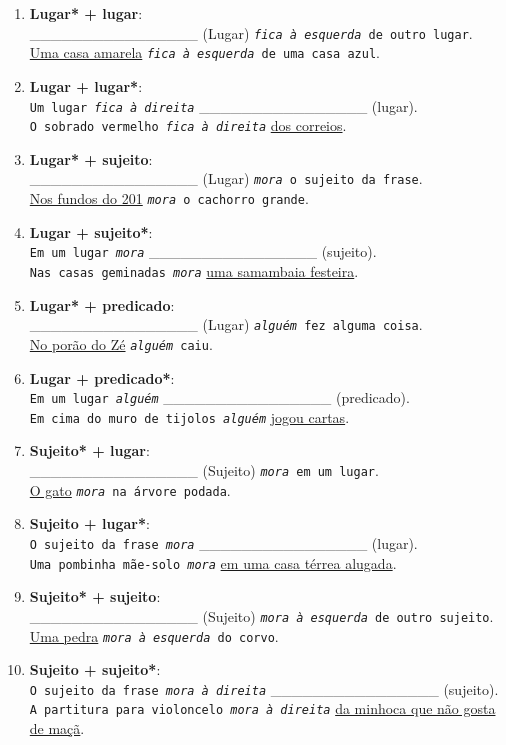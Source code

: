 \documentclass[12pt]{article}
\newcommand{\linha}{ \_\_\_\_\_\_\_\_\_\_\_\_\_\_\_\_ }
\newcommand{\tipo}[2]{\bigskip \item\textbf{#1 + #2}: \\}
\begin{document}
\begin{enumerate}
	\tipo{Lugar*}{lugar} 
		\linha (Lugar) \texttt{\textit{fica à esquerda} de outro lugar}.
		\\ \underline{Uma casa amarela} \texttt{\textit{fica à esquerda} de uma casa azul}.
		  
	\tipo{Lugar}{lugar*} 
		\texttt{Um lugar \textit{fica à direita}} \linha (lugar).	
		\\ \texttt{O sobrado vermelho \textit{fica à direita}} \underline{dos correios}.
		
	\tipo{Lugar*}{sujeito} 
		\linha (Lugar) \texttt{\textit{mora} o sujeito da frase}.
		\\ \underline{Nos fundos do 201} \texttt{\textit{mora} o cachorro grande}.
	
	\tipo{Lugar}{sujeito*} 
		\texttt{Em um lugar \textit{mora}} \linha (sujeito).
		\\ \texttt{Nas casas geminadas \textit{mora}} \underline{uma samambaia festeira}.
				
	\tipo{Lugar*}{predicado} 
		\linha (Lugar) \texttt{\textit{alguém} fez alguma coisa}.	
		\\ \underline{No porão do Zé} \texttt{\textit{alguém} caiu}.
		
	\tipo{Lugar}{predicado*} 
		\texttt{Em um lugar \textit{alguém}} \linha (predicado).	
		\\ \texttt{Em cima do muro de tijolos \textit{alguém}} \underline{jogou cartas}.
	
	\newpage
		
	\tipo{Sujeito*}{lugar} 
		\linha (Sujeito) \texttt{\textit{mora} em um lugar}.
		\\ \underline{O gato} \texttt{\textit{mora} na árvore podada}.
	
	\tipo{Sujeito}{lugar*} 
		\texttt{O sujeito da frase \textit{mora}} \linha (lugar).	
		\\ \texttt{Uma pombinha mãe-solo \textit{mora}} \underline{em uma casa térrea alugada}.
		
	\tipo{Sujeito*}{sujeito} 
		\linha (Sujeito) \texttt{\textit{mora à esquerda} de outro sujeito}.
		\\ \underline{Uma pedra} \texttt{\textit{mora à esquerda} do corvo}.
	
	\tipo{Sujeito}{sujeito*} 
		\texttt{O sujeito da frase \textit{mora à direita}} \linha (sujeito).	
		\\ \texttt{A partitura para violoncelo \textit{mora à direita}} \underline{da minhoca que não gosta de maçã}.
		

\end{enumerate}
\end{document}
